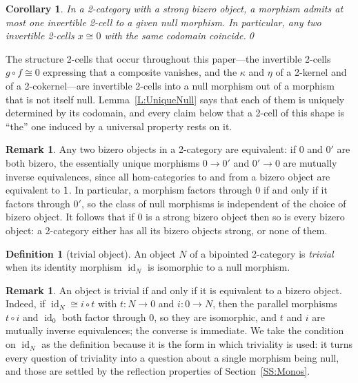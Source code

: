 \documentclass[reqno,a4paper]{amsart}
\numberwithin{equation}{section}
\theoremstyle{plain}
\newtheorem{corollary}[subsection]{Corollary}
\theoremstyle{definition}
\newtheorem{definition}[subsection]{Definition}
\newtheorem{remark}[subsection]{Remark}
\newcommand{\noproof}{\hfill \qed}
\def\nameit#1{\textrm{#1}~}
\def\lemx{\nameit{Lemma}}
\def\dfn#1{{\itshape #1}}
\newcommand{\comp}{\circ}
\newcommand{\iso}{\cong}
\renewcommand{\1}{\onecat{1}}
\newcommand{\id}[1]{\operatorname{id}_{#1}}
\begin{document}
\begin{corollary}\label{C:UniqueNull}
	In a 2-category with a strong bizero object, a morphism admits at most one invertible 2-cell to a given null morphism. In particular, any two invertible 2-cells \(x\iso 0\) with the same codomain coincide.\noproof
\end{corollary}

The structure 2-cells that occur throughout this paper---the invertible 2-cells \(g\comp f\iso 0\) expressing that a composite vanishes, and the \(\kappa\) and \(\eta\) of a 2-kernel and of a 2-cokernel---are invertible 2-cells into a null morphism out of a morphism that is not itself null. \lemx\ref{L:UniqueNull} says that each of them is uniquely determined by its codomain, and every claim below that a 2-cell of this shape is ``the'' one induced by a universal property rests on it.

\begin{remark}\label{Rem Bizero Unique}
	Any two bizero objects in a 2-category are equivalent: if \(0\) and \(0'\) are both bizero, the essentially unique morphisms \(0\to 0'\) and \(0'\to 0\) are mutually inverse equivalences, since all hom-categories to and from a bizero object are equivalent to \(\1\). In particular, a morphism factors through \(0\) if and only if it factors through \(0'\), so the class of null morphisms is independent of the choice of bizero object. It follows that if \(0\) is a strong bizero object then so is every bizero object: a 2-category either has all its bizero objects strong, or none of them.
\end{remark}

\begin{definition}[trivial object]\label{Def Trivial}
	An object \(N\) of a bipointed 2-category is \dfn{trivial} when its identity morphism \(\id{N}\) is isomorphic to a null morphism.
\end{definition}

\begin{remark}\label{Rem Trivial}
	An object is trivial if and only if it is equivalent to a bizero object. Indeed, if \(\id{N}\iso i\comp t\) with \(t\colon N\to 0\) and \(i\colon 0\to N\), then the parallel morphisms \(t\comp i\) and \(\id{0}\) both factor through \(0\), so they are isomorphic, and \(t\) and \(i\) are mutually inverse equivalences; the converse is immediate. We take the condition on \(\id{N}\) as the definition because it is the form in which triviality is used: it turns every question of triviality into a question about a single morphism being null, and those are settled by the reflection properties of Section~\ref{SS:Monos}.
\end{remark}
\end{document}
